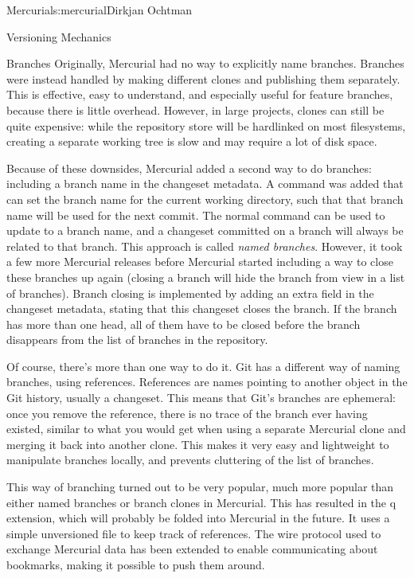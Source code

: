 \begin{aosachapter}{Mercurial}{s:mercurial}{Dirkjan Ochtman}
\begin{aosasect1}{Versioning Mechanics}
\begin{aosasect2}{Branches}
Originally, Mercurial had no way to explicitly name branches. Branches
were instead handled by making different clones and publishing them
separately. This is effective, easy to understand, and especially
useful for feature branches, because there is little
overhead. However, in large projects, clones can still be quite
expensive: while the repository store will be hardlinked on most
filesystems, creating a separate working tree is slow and may require
a lot of disk space.

Because of these downsides, Mercurial added a second way to do
branches: including a branch name in the changeset metadata. A
 command was added that can set the branch name for the
current working directory, such that that branch name will be used for
the next commit. The normal  command can be used to
update to a branch name, and a changeset committed on a branch will
always be related to that branch. This approach is called \emph{named
branches}. However, it took a few more Mercurial releases before
Mercurial started including a way to close these branches up
again (closing a branch will hide the branch from view in a list of
branches). Branch closing is implemented by adding an extra field in the changeset
metadata, stating that this changeset closes the branch. If the branch
has more than one head, all of them have to be closed before the
branch disappears from the list of branches in the repository.

Of course, there's more than one way to do it.
Git has a different way of naming branches, using
references. References are names pointing to another object in the
Git history, usually a changeset. This means that Git's branches are
ephemeral: once you remove the reference, there is no trace of the
branch ever having existed, similar to what you would get when using a
separate Mercurial clone and merging it back into another clone. This
makes it very easy and lightweight to manipulate branches locally, and
prevents cluttering of the list of branches.

This way of branching turned out to be very popular, much more popular
than either named branches or branch clones in Mercurial. This has
resulted in the q extension, which will probably be
folded into Mercurial in the future. It uses a simple unversioned file
to keep track of references. The wire protocol used to exchange
Mercurial data has been extended to enable communicating about
bookmarks, making it possible to push them around.

\end{aosasect2}


\end{aosasect1}
\end{aosachapter}
